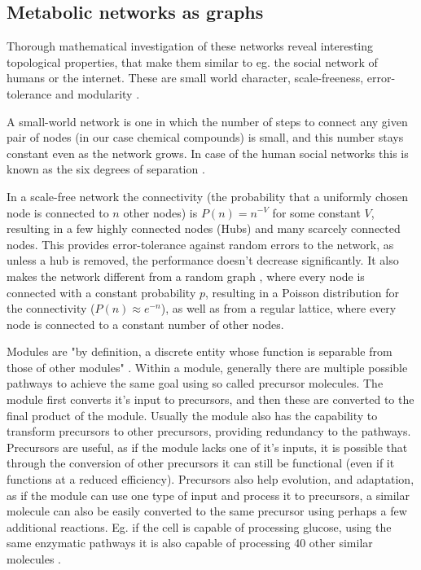 \documentclass[10pt,a4paper]{article}
\begin{document}
	
	\subsection{Metabolic networks as graphs}
	Thorough mathematical investigation of these networks reveal interesting topological properties, that make them similar to eg. the social network of humans or the internet. These are small world character, scale-freeness, error-tolerance \cite{largescale} and modularity .
	
	A small-world network \cite{smallworld} is one in which the number of steps to connect any given pair of nodes (in our case chemical compounds) is small, and this number stays constant even as the network grows. In case of the human social networks this is known as the six degrees of separation \cite{sixdegrees}.
	 
	In a scale-free network the connectivity (the probability that a uniformly chosen node is connected to $n$ other nodes) is $P(n)=n^{-V}$ for some constant $V$, resulting in a few highly connected nodes (Hubs) and many scarcely connected nodes. This provides error-tolerance against random errors to the network, as unless a hub is removed, the performance doesn't decrease significantly. It also makes the network different from a random graph \cite{randomgraphs}, where every node is connected with a constant probability $p$, resulting in a Poisson distribution for the connectivity ($P(n) \approx e^{-n}$), as well as from a regular lattice, where every node is connected to a constant number of other nodes.
	  
	Modules are "by definition, a discrete entity whose function is separable from those of other modules" \cite{modulardef}. Within a module, generally there are multiple possible pathways to achieve the same goal using so called precursor molecules. The module first converts it's input to precursors, and then these are converted to the final product of the module. Usually the module also has the capability to transform precursors to other precursors, providing redundancy to the pathways. Precursors are useful, as if the module lacks one of it's inputs, it is possible that through the conversion of other precursors it can still be functional (even if it functions at a reduced efficiency). Precursors also help evolution, and adaptation, as if the module can use one type of input and process it to precursors, a similar molecule can also be easily converted to the same precursor using perhaps a few additional reactions. Eg. if the cell is capable of processing glucose, using the same enzymatic pathways it is also capable of processing 40 other similar molecules \cite{latent}.
	
\end{document}
